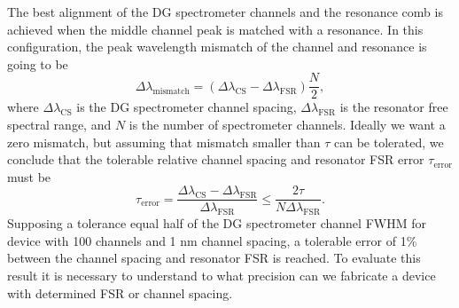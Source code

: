 \documentclass[12pt,twoside,english]{book}
\renewcommand{\~}{\perispomeni}%
\numberwithin{equation}{section}
\numberwithin{figure}{section}
\newcommand\fnurl[2]{%
 \href{#2}{#1}\footnote{\url{#2}}%
}
\begin{document}
The best alignment of the DG spectrometer channels and the resonance comb is achieved when the middle channel peak is matched with a resonance. In this configuration, the peak wavelength mismatch of the channel and resonance is going to be
\begin{equation}
\Delta\lambda_{\text{mismatch}}=\left(\Delta\lambda_{\text{CS}}-\Delta\lambda_{\text{FSR}}\right)\frac{N}{2},
\label{eq:missmatch}
\end{equation}
where $\Delta\lambda_{\text{CS}}$ is the DG spectrometer channel spacing, $\Delta\lambda_{\text{FSR}}$ is the resonator free spectral range, and $N$ is the number of spectrometer channels. Ideally we want a zero mismatch, but assuming that mismatch smaller than $\tau$ can be tolerated, we conclude that the tolerable relative channel spacing and resonator FSR error $\tau_{\text{error}}$ must be
\begin{equation}
\tau_{\text{error}}=\frac{\Delta\lambda_{\text{CS}}-\Delta\lambda_{\text{FSR}}}{\Delta\lambda_{\text{FSR}}}\le\frac{2\tau}{N\Delta\lambda_{\text{FSR}}}.
\label{eq:tolerable error}
\end{equation}
Supposing a tolerance equal half of the DG spectrometer channel FWHM for device with 100 channels and 1 nm channel spacing, a tolerable error of 1\% between the channel spacing and resonator FSR is reached.
To evaluate this result it is necessary to understand to what precision can we fabricate a device with determined FSR or channel spacing.

%
%
\end{document}
